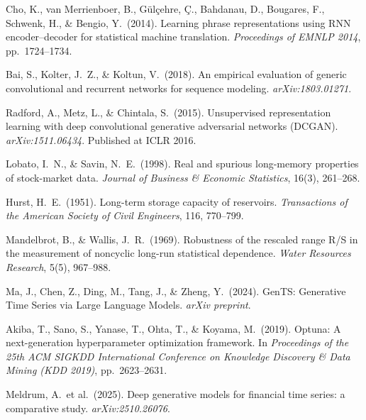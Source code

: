 \documentclass[10pt]{article}
\begin{document}
{\begin{enumerate}[label={\textbf{[\arabic*]}},leftmargin=2.8em,itemsep=5pt,parsep=0pt,topsep=2pt]
\item \hypertarget{R:19}{}%
  Cho, K., van Merrienboer, B., G\"{u}l\c{c}ehre, \c{C}., Bahdanau, D., Bougares, F.,
  Schwenk, H., \& Bengio, Y.\ (2014).
  Learning phrase representations using RNN encoder--decoder for statistical machine translation.
  \textit{Proceedings of EMNLP 2014}, pp.\ 1724--1734.

\item \hypertarget{R:20}{}%
  Bai, S., Kolter, J.\ Z., \& Koltun, V.\ (2018).
  An empirical evaluation of generic convolutional and recurrent networks for sequence modeling.
  \textit{arXiv:1803.01271}.

\item \hypertarget{R:21}{}%
  Radford, A., Metz, L., \& Chintala, S.\ (2015).
  Unsupervised representation learning with deep convolutional generative adversarial networks (DCGAN).
  \textit{arXiv:1511.06434}. Published at ICLR 2016.

\item \hypertarget{R:22}{}%
  Lobato, I.\ N., \& Savin, N.\ E.\ (1998).
  Real and spurious long-memory properties of stock-market data.
  \textit{Journal of Business \& Economic Statistics}, 16(3), 261--268.

\item \hypertarget{R:23}{}%
  Hurst, H.\ E.\ (1951).
  Long-term storage capacity of reservoirs.
  \textit{Transactions of the American Society of Civil Engineers}, 116, 770--799.

\item \hypertarget{R:24}{}%
  Mandelbrot, B., \& Wallis, J.\ R.\ (1969).
  Robustness of the rescaled range R/S in the measurement of noncyclic long-run
  statistical dependence.
  \textit{Water Resources Research}, 5(5), 967--988.

\item \hypertarget{R:25}{}%
  Ma, J., Chen, Z., Ding, M., Tang, J., \& Zheng, Y.\ (2024).
  GenTS: Generative Time Series via Large Language Models.
  \textit{arXiv preprint}.

\item \hypertarget{R:26}{}%
  Akiba, T., Sano, S., Yanase, T., Ohta, T., \& Koyama, M.\ (2019).
  Optuna: A next-generation hyperparameter optimization framework.
  In \textit{Proceedings of the 25th ACM SIGKDD International Conference on Knowledge
  Discovery \& Data Mining (KDD 2019)}, pp.\ 2623--2631.

\item \hypertarget{R:27}{}%
  Meldrum, A.\ et al.\ (2025).
  Deep generative models for financial time series: a comparative study.
  \textit{arXiv:2510.26076}.


\end{enumerate}}
\end{document}
